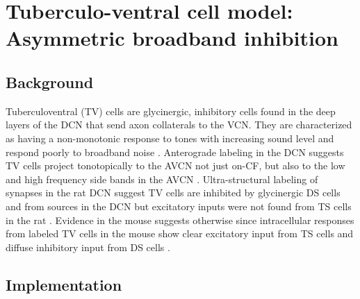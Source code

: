 
\graphicspath{{/media/data/Work/cnstellate/TV_notch/}{/media/data/Work/Responses/}{/media/data/Work/cnstellate/}{/media/data/Work/thesis/ans2010/gfx/}}
\newpage
\section[TV Cell Model]{Tuberculo-ventral cell model: Asymmetric broadband inhibition }
\label{sec:tv-cell-model}

\subsection{Background}

Tuberculoventral (TV) cells are glycinergic, inhibitory cells found in
the deep layers of the DCN that send axon collaterals to the VCN. They
are characterized as having a non-monotonic response to tones with
increasing sound level and respond poorly to broadband noise
\citep{SpirouDavisEtAl:1999,NelkenYoung:1997,ReissYoung:2005}.
Anterograde labeling in the DCN suggests TV cells project
tonotopically to the AVCN not just on-CF, but also to the low and high
frequency side bands in the AVCN
\citep{MunirathinamOstapoffEtAl:2004,OstapoffMorestEtAl:1999}.
Ultra-structural labeling of synapses in the rat DCN suggest TV cells
are inhibited by glycinergic DS cells and from sources in the DCN but
excitatory inputs were not found from TS cells in the rat
\citep{Rubio:2005}. Evidence in the mouse suggests otherwise since
intracellular responses from labeled TV cells in the mouse show clear
excitatory input from TS cells and diffuse inhibitory input from DS
cells \citep{ZhangOertel:1993b,WickesbergOertel:1993}.

\subsection{Implementation}

